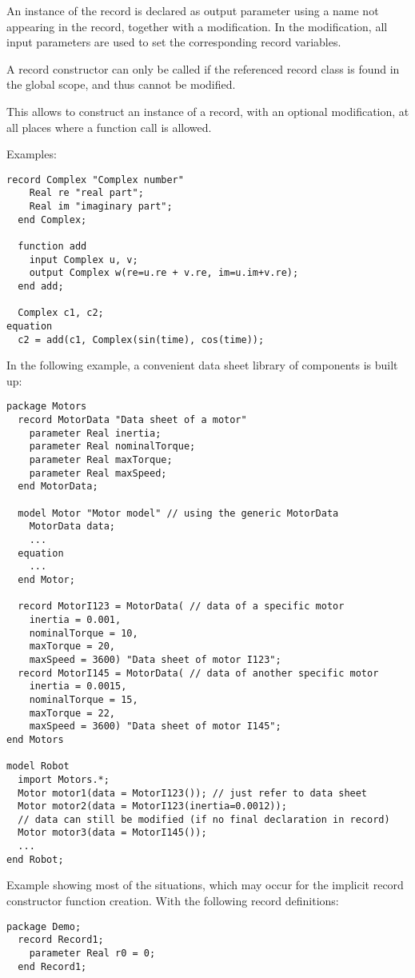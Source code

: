 An instance of the record is declared as output parameter using
a name not appearing in the record, together with a modification. In
the modification, all input parameters are used to set the corresponding
record variables.

A record constructor can only be called if the referenced record class
is found in the global scope, and thus cannot be modified.

\begin{nonnormative}
This allows to construct an instance of a record, with an
optional modification, at all places where a function call is allowed.

Examples:
\begin{lstlisting}[language=modelica]
  record Complex "Complex number"
    Real re "real part";
    Real im "imaginary part";
  end Complex;

  function add
    input Complex u, v;
    output Complex w(re=u.re + v.re, im=u.im+v.re);
  end add;

  Complex c1, c2;
equation
  c2 = add(c1, Complex(sin(time), cos(time));
\end{lstlisting}

In the following example, a convenient data sheet library of
components is built up:
\begin{lstlisting}[language=modelica]
package Motors
  record MotorData "Data sheet of a motor"
    parameter Real inertia;
    parameter Real nominalTorque;
    parameter Real maxTorque;
    parameter Real maxSpeed;
  end MotorData;

  model Motor "Motor model" // using the generic MotorData
    MotorData data;
    ...
  equation
    ...
  end Motor;

  record MotorI123 = MotorData( // data of a specific motor
    inertia = 0.001,
    nominalTorque = 10,
    maxTorque = 20,
    maxSpeed = 3600) "Data sheet of motor I123";
  record MotorI145 = MotorData( // data of another specific motor
    inertia = 0.0015,
    nominalTorque = 15,
    maxTorque = 22,
    maxSpeed = 3600) "Data sheet of motor I145";
end Motors

model Robot
  import Motors.*;
  Motor motor1(data = MotorI123()); // just refer to data sheet
  Motor motor2(data = MotorI123(inertia=0.0012));
  // data can still be modified (if no final declaration in record)
  Motor motor3(data = MotorI145());
  ...
end Robot;
\end{lstlisting}

Example showing most of the situations, which may occur for the
implicit record constructor function creation. With the following record
definitions:
\begin{lstlisting}[language=modelica]
package Demo;
  record Record1;
    parameter Real r0 = 0;
  end Record1;


\end{lstlisting}
\end{nonnormative}
